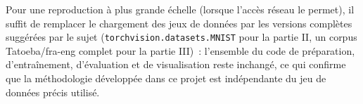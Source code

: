 \documentclass[11pt,a4paper]{article}
\begin{document}
Pour une reproduction à plus grande échelle (lorsque l'accès réseau le permet), il suffit de remplacer le chargement des jeux de données par les versions complètes suggérées par le sujet (\texttt{torchvision.datasets.MNIST} pour la partie II, un corpus Tatoeba/fra-eng complet pour la partie III)~: l'ensemble du code de préparation, d'entraînement, d'évaluation et de visualisation reste inchangé, ce qui confirme que la méthodologie développée dans ce projet est indépendante du jeu de données précis utilisé.
\end{document}
